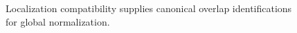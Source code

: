 \begin{figure}[htbp]\centering
{}
\caption{Localization compatibility supplies canonical overlap identifications for global normalization.}\label{fig:vi28-gluing}\end{figure}
